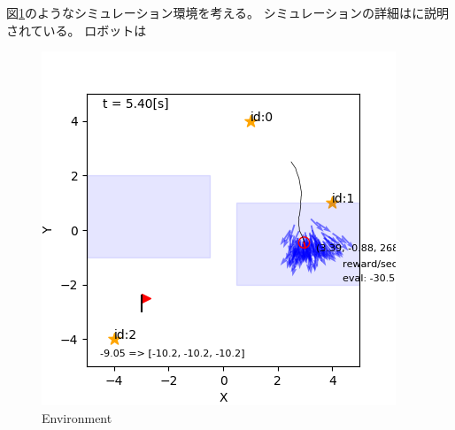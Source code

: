 \documentclass{jarticle}
\begin{document}
図\ref{fig:environment}のようなシミュレーション環境を考える。
シミュレーションの詳細は\cite{上田2019}に説明されている。
ロボットは




\begin{figure}[tbh]
 \centering
  \includegraphics[width=1.0\linewidth]{figs/puddle_world.png}
  \vspace*{-4mm}
  \caption{Environment}
  \label{fig:environment}
\end{figure}

\end{document}
